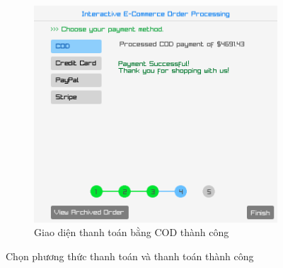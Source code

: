 \begin{figure}[!ht]
\begin{subfigure}{0.55\textwidth}
    \centering
    \includegraphics[width=\textwidth]{../assets/screenshots/gui/payment_cod_success.png}
    \caption{Giao diện thanh toán bằng COD thành công}
  \end{subfigure}
  \caption{Chọn phương thức thanh toán và thanh toán thành công}
\end{figure}
